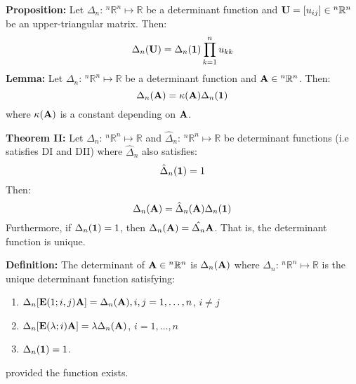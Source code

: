 \documentclass{article}
\begin{document}
    \begin{minipage}[t]{0.45\linewidth}
        \textbf{Proposition:} Let $\Delta_n:\, {^n}\mathbb{R}^n \mapsto \mathbb{R}$ be a determinant function and $\mathbf{U} = [u_{ij}] \in {^n}\mathbb{R}^n$ be an upper-triangular matrix. Then:
        \begin{equation*}
            \Delta_n(\mathbf{U}) = \Delta_n(\mathbf{1})\prod_{k=1}^{n}u_{kk}
        \end{equation*}
        \textbf{Lemma:} Let $\Delta_n:\, {^n}\mathbb{R}^n \mapsto \mathbb{R}$ be a determinant function and $\mathbf{A} \in {^n}\mathbb{R}^n$. Then:
        \begin{equation*}
            \Delta_n(\mathbf{A})=\kappa(\mathbf{A})\Delta_n(\mathbf{1})
        \end{equation*}
        where $\kappa(\mathbf{A})$ is a constant depending on $\mathbf{A}$.
        \vspace{2mm}

        \textbf{Theorem II:} Let $\Delta_n:\, {^n}\mathbb{R}^n \mapsto \mathbb{R}$ and $\hat{\Delta}_n:\, {^n}\mathbb{R}^n \mapsto  \mathbb{R}$ be determinant functions (i.e satisfies DI and DII) where $\hat{\Delta}_n$ also satisfies:
        \begin{equation*}
            \hat{\Delta}_n(\mathbf{1})=1
        \end{equation*}
        Then:
        \begin{equation*}
            \Delta_n(\mathbf{A})=\hat{\Delta}_n(\mathbf{A})\Delta_n(\mathbf{1})
        \end{equation*}
        Furthermore, if $\Delta_n(\mathbf{1})=1$, then $\Delta_n(\mathbf{A}) = \hat{\Delta_n}\mathbf{A}$. That is, the determinant function is unique.
        \vspace{2mm}

        \textbf{Definition:} The determinant of $\mathbf{A} \in {^n}\mathbb{R}^n$ is $\Delta_n(\mathbf{A})$ where $\Delta_n:\, {^n}\mathbb{R}^n \mapsto \mathbb{R}$ is the unique determinant function satisfying:
        \begin{enumerate}[label=D\Roman*]
            \item $\Delta_n[\mathbf{E}(1;i,j)\mathbf{A}] = \Delta_n(\mathbf{A}), i,j=1,\dots,n$, $i\neq j$
            \item $\Delta_n[\mathbf{E}(\lambda;i)\mathbf{A}] = \lambda \Delta_n(\mathbf{A})$, $i=1,\dots, n$
            \item $\Delta_n(\mathbf{1})=1$.
        \end{enumerate}
        provided the function exists.
        \vspace{2mm}


\end{minipage}
\end{document}
